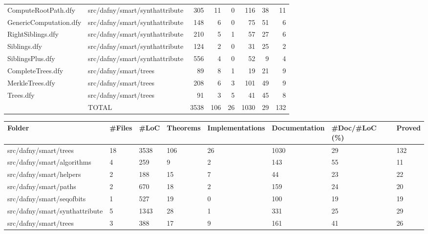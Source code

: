 \documentclass[a4paper, 12pt]{article}
\begin{document}
\begin{tabular}{llrrrrrr}
               ComputeRootPath.dfy &  src/dafny/smart/synthattribute &   305 &        11 &                0 &            116 &             38 &      11 \\
            GenericComputation.dfy &  src/dafny/smart/synthattribute &   148 &         6 &                0 &             75 &             51 &       6 \\
                 RightSiblings.dfy &  src/dafny/smart/synthattribute &   210 &         5 &                1 &             57 &             27 &       6 \\
                      Siblings.dfy &  src/dafny/smart/synthattribute &   124 &         2 &                0 &             31 &             25 &       2 \\
                  SiblingsPlus.dfy &  src/dafny/smart/synthattribute &   556 &         4 &                0 &             52 &              9 &       4 \\
                 CompleteTrees.dfy &           src/dafny/smart/trees &    89 &         8 &                1 &             19 &             21 &       9 \\
                   MerkleTrees.dfy &           src/dafny/smart/trees &   208 &         6 &                3 &            101 &             49 &       9 \\
                         Trees.dfy &           src/dafny/smart/trees &    91 &         3 &                5 &             41 &             45 &       8 \\
                                   &                           TOTAL &  3538 &       106 &               26 &           1030 &             29 &     132 \\
\bottomrule
\end{tabular}

\vspace{2em}
\begin{tabular}{llllllll}
\toprule
                         Folder & \#Files &  \#LoC & Theorems & Implementations & Documentation & \#Doc/\#LoC (\%) & Proved \\
\midrule
          src/dafny/smart/trees &     18 &  3538 &      106 &              26 &          1030 &            29 &    132 \\
     src/dafny/smart/algorithms &      4 &   259 &        9 &               2 &           143 &            55 &     11 \\
        src/dafny/smart/helpers &      2 &   188 &       15 &               7 &            44 &            23 &     22 \\
          src/dafny/smart/paths &      2 &   670 &       18 &               2 &           159 &            24 &     20 \\
      src/dafny/smart/seqofbits &      1 &   527 &       19 &               0 &           100 &            19 &     19 \\
 src/dafny/smart/synthattribute &      5 &  1343 &       28 &               1 &           331 &            25 &     29 \\
          src/dafny/smart/trees &      3 &   388 &       17 &               9 &           161 &            41 &     26 \\
\bottomrule
\end{tabular}
\end{document}
